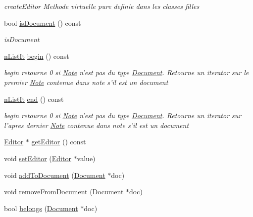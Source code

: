 \begin{DoxyCompactItemize}
\begin{DoxyCompactList}\small\item\em create\-Editor Methode virtuelle pure definie dans les classes filles \end{DoxyCompactList}\item 
bool \hyperlink{class_note_a543b160dbe2bcb3c746cb9679ad1eb64}{is\-Document} () const 
\begin{DoxyCompactList}\small\item\em is\-Document \end{DoxyCompactList}\item 
\hyperlink{_document_8h_adfa7415447032dfb0c19676b86692b8e}{n\-List\-It} \hyperlink{class_note_a3db96c7ec649e4e4a4225462ffb40d6e}{begin} () const 
\begin{DoxyCompactList}\small\item\em begin retourne 0 si \hyperlink{class_note}{Note} n'est pas du type \hyperlink{class_document}{Document}. Retourne un iterator sur le premier \hyperlink{class_note}{Note} contenue dans note s'il est un document \end{DoxyCompactList}\item 
\hyperlink{_document_8h_adfa7415447032dfb0c19676b86692b8e}{n\-List\-It} \hyperlink{class_note_a0c116937ded5b540a444be8ad737ee39}{end} () const 
\begin{DoxyCompactList}\small\item\em begin retourne 0 si \hyperlink{class_note}{Note} n'est pas du type \hyperlink{class_document}{Document}. Retourne un iterator sur l'apres dernier \hyperlink{class_note}{Note} contenue dans note s'il est un document \end{DoxyCompactList}\item 
\hyperlink{class_editor}{Editor} $\ast$ \hyperlink{class_note_a442d12ee613944bcc57ae29cf2d27213}{get\-Editor} () const 
\item 
void \hyperlink{class_note_a263068eb42d923b133c181fee6bb4c7d}{set\-Editor} (\hyperlink{class_editor}{Editor} $\ast$value)
\item 
void \hyperlink{class_note_afa6dd579b094a73deada5e2d2fe1673b}{add\-To\-Document} (\hyperlink{class_document}{Document} $\ast$doc)
\item 
void \hyperlink{class_note_a397a19923fcfc9f84cc834cbfd14bfe5}{remove\-From\-Document} (\hyperlink{class_document}{Document} $\ast$doc)
\item 
bool \hyperlink{class_note_a6a4f412f9be69e950de550e4de11ba06}{belongs} (\hyperlink{class_document}{Document} $\ast$doc)

\end{DoxyCompactItemize}
